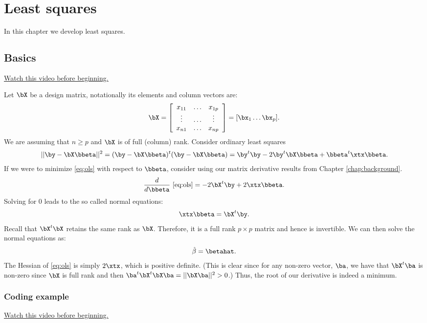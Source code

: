 \chapter{Least squares}

In this chapter we develop least squares. 

\section{Basics}
\href{https://www.youtube.com/watch?v=tcmqwFDm-2c&list=PLpl-gQkQivXhdgUCdaUQcdb31CRe8Mm2y&index=21}{Watch this video before beginning.}

Let $\bX$ be a design matrix, notationally its
elements and column vectors are:
$$
\bX =
\left[
\begin{array}{ccc}
x_{11} & \ldots & x_{1p}  \\
\vdots & \ldots & \vdots \\
x_{n1} & \ldots & x_{np}
\end{array}
\right]
= [\bx_1 \ldots \bx_p].
$$
We are assuming that $n \geq p$ and $\bX$ is of full (column) rank. 
Consider ordinary least squares
\begin{equation}
\label{eq:ols}
|| \by - \bX \bbeta ||^2 = (\by - \bX \bbeta)^t (\by - \bX \bbeta)
= \by^t \by - 2 \by^t \bX \bbeta + \bbeta^t \xtx \bbeta.
\end{equation}
If we were to minimize \eqref{eq:ols} with respect to $\bbeta$,
consider using our matrix derivative results from Chapter \ref{chap:background}.
$$
\frac{d}{d\bbeta}~\eqref{eq:ols}
= -2 \bX^t \by + 2 \xtx \bbeta.
$$
Solving for $0$ leads to the so called normal equations:
$$\xtx \bbeta = \bX^t \by.$$
Recall that $\bX^t \bX$ retains the same rank as $\bX$. Therefore,
it is a full rank $p\times p$ matrix and hence is invertible. We
can then solve the normal equations as:
\begin{equation}
\label{eq:betahat}
\hat \beta = \betahat.
\end{equation}
The Hessian of \eqref{eq:ols} is simply $2\xtx$, which is positive
definite. (This is clear since for any non-zero vector, $\ba$, we have that
$\bX^t \ba$ is non-zero since $\bX$ is full rank and then
$\ba^t \bX^t \bX \ba = ||\bX \ba||^2 > 0$.) Thus, the root of
our derivative is indeed a minimum. 

\subsection{Coding example}
\href{https://www.youtube.com/watch?v=walb3qHidJQ&list=PLpl-gQkQivXhdgUCdaUQcdb31CRe8Mm2y&index=22}{Watch this video before beginning.}


